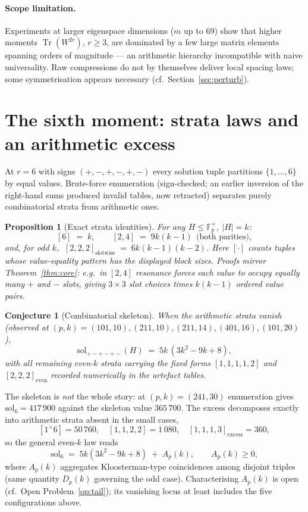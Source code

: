 \documentclass[11pt]{article}
\newtheorem{proposition}[theorem]{Proposition}
\newtheorem{conjecture}[theorem]{Conjecture}
\begin{document}
\paragraph{Scope limitation.}
Experiments at larger eigenspace dimensions ($m$ up to $69$) show that
higher moments $\operatorname{Tr}(W^{2r})$, $r\ge3$, are dominated by
a few large matrix elements spanning orders of magnitude --- an
arithmetic hierarchy incompatible with naive universality. Raw
compressions do not by themselves deliver local spacing laws;
some symmetrisation appears necessary (cf.\
Section~\ref{sec:perturb}).

\section{The sixth moment: strata laws and an arithmetic excess}\label{sec:r6}

At $r=6$ with signs $(+,-,+,-,+,-)$ every solution tuple partitions
$\{1,\dots,6\}$ by equal values. Brute-force enumeration
(sign-checked; an earlier inversion of the right-hand sums produced
invalid tables, now retracted) separates purely combinatorial strata
from arithmetic ones.

\begin{proposition}[Exact strata identities]\label{prop:r6strata}
For any $H\le\mathbb F_p^\times$, $|H|=k$:
\[
[6]\;=\;k,\qquad
[2,4]\;=\;9k(k-1)\ \ \text{(both parities)},
\]
and, for \emph{odd} $k$,
$\;[2,2,2]_{\mathrm{slotwise}}\;=\;6k(k-1)(k-2)$.
Here $[\cdot]$ counts tuples whose value-equality pattern has the
displayed block sizes. Proofs mirror
Theorem~\ref{thm:core}: e.g.\ in $[2,4]$ resonance forces each value
to occupy equally many $+$ and $-$ slots, giving $3\times3$ slot
choices times $k(k-1)$ ordered value pairs.
\end{proposition}

\begin{conjecture}[Combinatorial skeleton]\label{conj:r6skeleton}
When the arithmetic strata vanish (observed at
$(p,k)=(101,10),(211,10),(211,14),(401,16),(101,20)$),
\[
\mathrm{sol}_{+-+-+-}(H)\;=\;5k\,(3k^{2}-9k+8),
\]
with all remaining even-$k$ strata carrying the fixed forms
$[1,1,1,1,2]$ and $[2,2,2]_{\mathrm{even}}$ recorded numerically in
the artefact tables.
\end{conjecture}

The skeleton is \emph{not} the whole story: at $(p,k)=(241,30)$
enumeration gives $\mathrm{sol}_6=417\,900$ against the skeleton
value $365\,700$. The excess decomposes exactly into arithmetic
strata absent in the small cases,
\[
[1^{\times}6]=50\,760,\quad
[1,1,2,2]=1\,080,\quad
[1,1,1,3]_{\mathrm{excess}}=360 ,
\]
so the general even-$k$ law reads
\[
\mathrm{sol}_6 \;=\; 5k(3k^{2}-9k+8)\;+\;A_p(k),
\qquad A_p(k)\ge 0 ,
\]
where $A_p(k)$ aggregates Kloosterman-type coincidences among
disjoint triples (same quantity $D_p(k)$ governing the odd case).
Characterising $A_p(k)$ is open (cf.\
Open Problem~\ref{op:tail}); its vanishing locus at least includes
the five configurations above.
\end{document}

